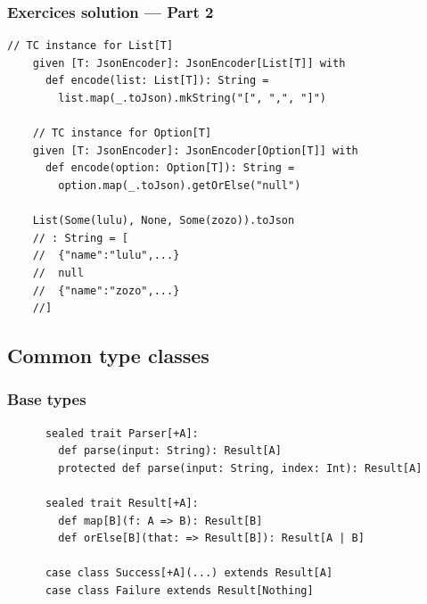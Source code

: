 \begin{frame}[fragile]
  \frametitle{Exercices solution --- Part 2}

  \begin{lstlisting}[gobble=4]
    // TC instance for List[T]
    given [T: JsonEncoder]: JsonEncoder[List[T]] with
      def encode(list: List[T]): String =
        list.map(_.toJson).mkString("[", ",", "]")

    // TC instance for Option[T]
    given [T: JsonEncoder]: JsonEncoder[Option[T]] with
      def encode(option: Option[T]): String =
        option.map(_.toJson).getOrElse("null")

    List(Some(lulu), None, Some(zozo)).toJson
    // : String = [
    //  {"name":"lulu",...}
    //  null
    //  {"name":"zozo",...}
    //]
  \end{lstlisting}
\end{frame}

\subsection{Common type classes}

\begin{frame}[fragile]
  \frametitle{Base types}

  \begin{definition}
    \begin{lstlisting}
      sealed trait Parser[+A]:
        def parse(input: String): Result[A]
        protected def parse(input: String, index: Int): Result[A]
  
      sealed trait Result[+A]:
        def map[B](f: A => B): Result[B]
        def orElse[B](that: => Result[B]): Result[A | B]

      case class Success[+A](...) extends Result[A]
      case class Failure extends Result[Nothing]
    \end{lstlisting}
  \end{definition}
\end{frame}

